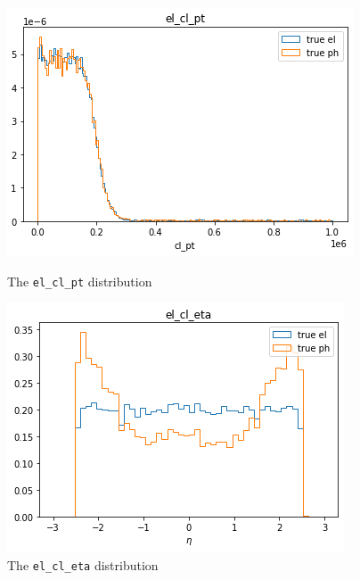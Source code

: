 \documentclass[a4paper, oneside, 11pt, openright]{book}
\begin{document}
				\begin{figure}[H]
						\begin{minipage}[b]{0.5\linewidth}
						\centering
						\includegraphics[width=.9\linewidth]{tesi_images/el_cl_pt.png} 
						\caption{The \texttt{el\_cl\_pt} distribution} 
						\label{fig: pt}
						\vspace{4ex}
					\end{minipage}%
					\begin{minipage}[b]{0.5\linewidth}
						\centering
						\includegraphics[width=.9\linewidth]{tesi_images/el_cl_eta.png} 
						\caption{The \texttt{el\_cl\_eta} distribution} 
						\label{fig: eta}
						\vspace{4ex}
					\end{minipage} 
				\end{figure}
			
\end{document}
